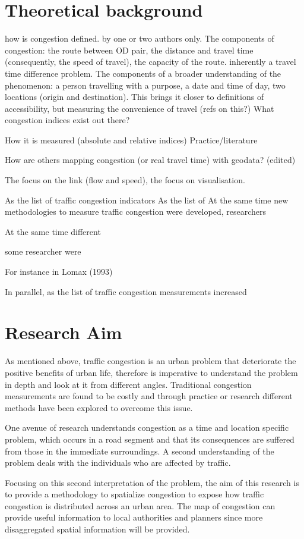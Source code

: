 \documentclass[a4paper]{jpconf}
\begin{document}
\section{Theoretical background}
how is congestion defined. by one or two authors only.
The components of congestion: the route between OD pair, the distance and travel time (consequently, the speed of travel), the capacity of the route. inherently a travel time difference problem.
The components of a broader understanding of the phenomenon: a person travelling with a purpose, a date and time of day, two locations (origin and destination). This brings it closer to definitions of accessibility, but measuring the convenience of travel (refs on this?)
\indent What congestion indices exist out there? \par
How it is measured (absolute and relative indices)
\indent Practice/literature\par


\indent How are others mapping congestion (or real travel time) with geodata? (edited) \par
The focus on the link (flow and speed), the focus on visualisation.





\indent As the list of traffic congestion indicators
As the list of 
At the same time new methodologies to measure traffic congestion were developed, researchers 


At the same time different 

some researcher were 

For instance in Lomax (1993) 

In parallel, as the list of traffic congestion measurements increased 








\section{Research Aim}
\indent As mentioned above, traffic congestion is an urban problem that deteriorate the positive benefits of urban life, therefore is imperative to understand the problem in depth and look at it from different angles. Traditional congestion measurements are found to be costly and through practice or research different methods have been explored to overcome this issue. \par
\indent One avenue of research understands congestion as a time and location specific problem, which occurs in a road segment and that its consequences are suffered from those in the immediate surroundings. A second understanding of the problem deals with the individuals who are affected by traffic. \par
\indent Focusing on this second interpretation of the problem, the aim of this research is to provide a methodology to spatialize congestion to expose how traffic congestion is distributed across an urban area. The map of congestion can provide useful information to local authorities and planners since more disaggregated spatial information will be provided. \par
\end{document}
